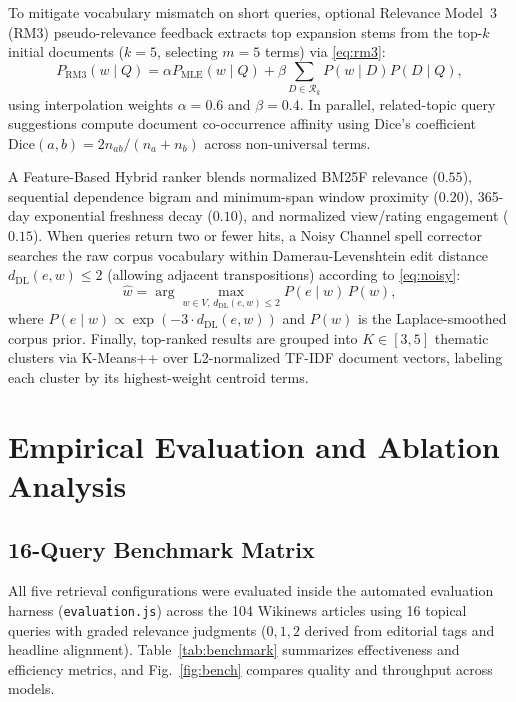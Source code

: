 \documentclass[conference]{IEEEtran}
\begin{document}
To mitigate vocabulary mismatch on short queries, optional Relevance Model~3 (RM3) pseudo-relevance feedback \cite{b4} extracts top expansion stems from the top-$k$ initial documents ($k=5$, selecting $m=5$ terms) via \eqref{eq:rm3}:
\begin{equation}
P_{\text{RM3}}(w \mid Q) = \alpha P_{\text{MLE}}(w \mid Q) + \beta \sum_{D \in \mathcal{R}_k} P(w \mid D) P(D \mid Q),
\label{eq:rm3}
\end{equation}
using interpolation weights $\alpha = 0.6$ and $\beta = 0.4$. In parallel, related-topic query suggestions compute document co-occurrence affinity using Dice's coefficient $\text{Dice}(a, b) = 2 n_{ab} / (n_a + n_b)$ across non-universal terms.

A Feature-Based Hybrid ranker blends normalized BM25F relevance ($0.55$), sequential dependence bigram and minimum-span window proximity ($0.20$), 365-day exponential freshness decay ($0.10$), and normalized view/rating engagement ($0.15$). When queries return two or fewer hits, a Noisy Channel spell corrector \cite{b6} searches the raw corpus vocabulary within Damerau-Levenshtein edit distance $d_{\text{DL}}(e, w) \le 2$ (allowing adjacent transpositions) according to \eqref{eq:noisy}:
\begin{equation}
\hat{w} = \arg\max_{w \in V,\, d_{\text{DL}}(e, w) \le 2} P(e \mid w)\, P(w),
\label{eq:noisy}
\end{equation}
where $P(e \mid w) \propto \exp(-3 \cdot d_{\text{DL}}(e,w))$ and $P(w)$ is the Laplace-smoothed corpus prior. Finally, top-ranked results are grouped into $K \in [3, 5]$ thematic clusters via K-Means++ over L2-normalized TF-IDF document vectors, labeling each cluster by its highest-weight centroid terms.

\section{Empirical Evaluation and Ablation Analysis}

\subsection{16-Query Benchmark Matrix}
All five retrieval configurations were evaluated inside the automated evaluation harness (\texttt{evaluation.js}) across the 104 Wikinews articles using 16 topical queries with graded relevance judgments ($0, 1, 2$ derived from editorial tags and headline alignment). Table~\ref{tab:benchmark} summarizes effectiveness and efficiency metrics, and Fig.~\ref{fig:bench} compares quality and throughput across models.
\end{document}
